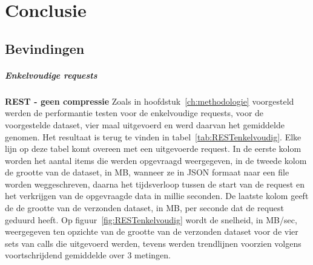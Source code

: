 
\chapter{Conclusie}%
\label{ch:conclusie}


\section{Bevindingen}
\paragraph{Enkelvoudige requests}
\textbf{REST - geen compressie}\newline
Zoals in hoofdstuk~\ref{ch:methodologie} voorgesteld werden de performantie testen voor de enkelvoudige requests, voor de voorgestelde dataset,
vier maal uitgevoerd en werd daarvan het gemiddelde genomen. Het resultaat is terug te vinden in tabel~\ref{tab:RESTenkelvoudig}.
Elke lijn op deze tabel komt overeen met een uitgevoerde request. In de eerste kolom worden het aantal items die werden opgevraagd weergegeven,
in de tweede kolom de grootte van de dataset, in MB, wanneer ze in JSON formaat naar een file worden weggeschreven,
daarna het tijdsverloop tussen de start van de request en het verkrijgen van de opgevraagde data in millie seconden. De laatste kolom geeft de de grootte van de
verzonden dataset, in MB, per seconde dat de request geduurd heeft.
Op figuur~\ref{fig:RESTenkelvoudig} wordt de snelheid, in MB/sec, weergegeven ten opzichte van de grootte van de verzonden dataset voor de vier sets van
calls die uitgevoerd werden, tevens werden trendlijnen voorzien volgens voortschrijdend gemiddelde over 3 metingen.\\

